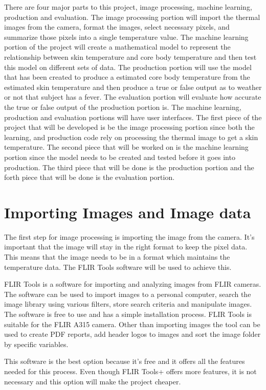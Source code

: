 ﻿\documentclass[onecolumn, draftclsnofoot,10pt, compsoc]{IEEEtran}
\begin{document}
There are four major parts to this project, image processing, machine learning, production and evaluation. The image processing portion will import the thermal images from the camera, format the images, select necessary pixels, and summarize those pixels into a single temperature value. The machine learning portion of the project will create a mathematical model to represent the relationship between skin temperature and core body temperature and then test this model on different sets of data. The production portion will use the model that has been created to produce a estimated core body temperature from the estimated skin temperature and then produce a true or false output as to weather or not that subject has a fever. The evaluation portion will evaluate how accurate the true or false output of the production portion is. The machine learning, production and evaluation portions will have user interfaces. The first piece of the project that will be developed is be the image processing portion since both the learning, and production code rely on processing the thermal image to get a skin temperature. The second piece that will be worked on is the machine learning portion since the model needs to be created and tested before it goes into production. The third piece that will be done is the production portion and the forth piece that will be done is the evaluation portion.


\section{Importing Images and Image data}

The first step for image processing is importing the image from the camera. It’s important that the image will stay in the right format to keep the pixel data. This means that the image needs to be in a format which maintains the temperature data. The FLIR Tools software will be used to achieve this. 

FLIR Tools is a software for importing and analyzing images from FLIR cameras. The software can be used to import images to a personal computer, search the image library using various filters, store search criteria and manipulate images. The software is free to use and has a simple installation process. FLIR Tools is suitable for the FLIR A315 camera. Other than importing images the tool can be used to create PDF reports, add header logos to images and sort the image folder by specific variables.\cite{ClaudeTech}

This software is the best option because it’s free and it offers all the features needed for this process. Even though FLIR Tools+ offers more features, it is not necessary and this option will make the project cheaper.
\end{document}
